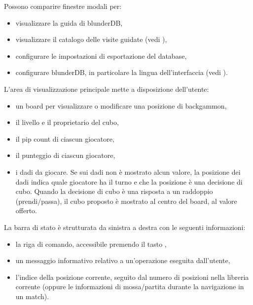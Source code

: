 \documentclass[letterpaper,10pt,italian]{sphinxmanual}
\begin{document}
\sphinxAtStartPar
Possono comparire finestre modali per:
\begin{itemize}
\item {} 
\sphinxAtStartPar
visualizzare la guida di blunderDB,

\item {} 
\sphinxAtStartPar
visualizzare il catalogo delle visite guidate (vedi {\hyperref[\detokenize{manuel:visites-guidees}]{}}),

\item {} 
\sphinxAtStartPar
configurare le impostazioni di esportazione del database,

\item {} 
\sphinxAtStartPar
configurare blunderDB, in particolare la lingua dell’interfaccia (vedi {\hyperref[\detokenize{manuel:configuration}]{}}).

\end{itemize}

\sphinxAtStartPar
L’area di visualizzazione principale mette a disposizione dell’utente:
\begin{itemize}
\item {} 
\sphinxAtStartPar
un board per visualizzare o modificare una posizione di backgammon,

\item {} 
\sphinxAtStartPar
il livello e il proprietario del cubo,

\item {} 
\sphinxAtStartPar
il pip count di ciascun giocatore,

\item {} 
\sphinxAtStartPar
il punteggio di ciascun giocatore,

\item {} 
\sphinxAtStartPar
i dadi da giocare. Se sui dadi non è mostrato alcun valore, la posizione dei dadi indica quale giocatore ha il turno e che la posizione è una decisione di cubo. Quando la decisione di cubo è una risposta a un raddoppio (prendi/passa), il cubo proposto è mostrato al centro del board, al valore offerto.

\end{itemize}

\sphinxAtStartPar
La barra di stato è strutturata da sinistra a destra con le seguenti informazioni:
\begin{itemize}
\item {} 
\sphinxAtStartPar
la riga di comando, accessibile premendo il tasto ,

\item {} 
\sphinxAtStartPar
un messaggio informativo relativo a un’operazione eseguita dall’utente,

\item {} 
\sphinxAtStartPar
l’indice della posizione corrente, seguito dal numero di posizioni nella libreria corrente (oppure le informazioni di mossa/partita durante la navigazione in un match).

\end{itemize}
\end{document}
